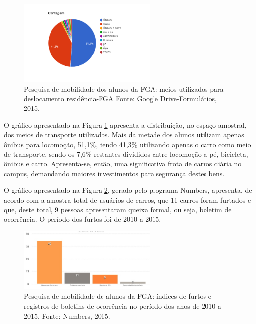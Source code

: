 \begin{figure}[H]
	\centering
	\includegraphics[width=0.6\textwidth]{figuras/resultadoquestionario}
	\caption{Pesquisa de mobilidade dos alunos da FGA: meios utilizados para deslocamento residência-FGA Fonte: Google Drive-Formulários, 2015.}
	\label{img:resultadoquestionario}
\end{figure}

O gráfico apresentado na Figura \ref{img:resultadoquestionario} apresenta a distribuição, no espaço amostral, dos meios  de transporte utilizados. Mais da metade dos alunos utilizam apenas ônibus para locomoção, 51,1\%, tendo 41,3\% utilizando apenas o carro como meio de transporte, sendo os 7,6\% restantes divididos entre locomoção a pé, bicicleta, ônibus e carro. Apresenta-se, então, uma significativa frota de carros diária no campus, demandando maiores investimentos para segurança destes bens.

O gráfico apresentado na Figura \ref{img:resultadoquestionario2}, gerado pelo programa Numbers, apresenta, de acordo com a amostra total de usuários de carros, que 11 carros foram furtados e que, deste total, 9 pessoas apresentaram queixa formal, ou seja, boletim de ocorrência. O período dos furtos foi de 2010 a 2015.

\begin{figure}[H]
	\centering
	\includegraphics[width=0.6\textwidth]{figuras/resultadoquestionario2}
	\caption{Pesquisa de mobilidade de alunos da FGA: índices de furtos e registros de boletins de ocorrência no período dos anos de 2010 a 2015. Fonte: Numbers, 2015.}
	\label{img:resultadoquestionario2}
\end{figure}

